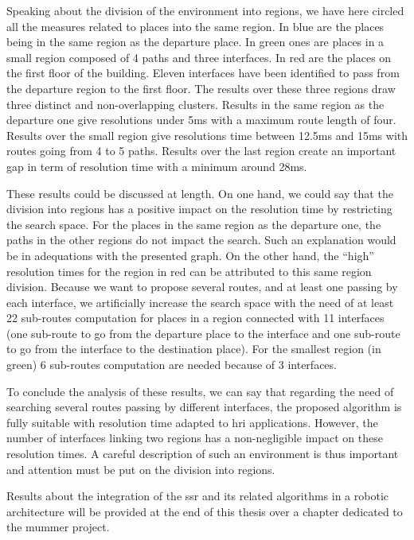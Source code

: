 Speaking about the division of the environment into regions, we have here circled all the measures related to places into the same region. In blue are the places being in the same region as the departure place. In green ones are places in a small region composed of 4 paths and three interfaces. In red are the places on the first floor of the building. Eleven interfaces have been identified to pass from the departure region to the first floor. The results over these three regions draw three distinct and non-overlapping clusters. Results in the same region as the departure one give resolutions under 5ms with a maximum route length of four. Results over the small region give resolutions time between 12.5ms and 15ms with routes going from 4 to 5 paths. Results over the last region create an important gap in term of resolution time with a minimum around 28ms. 

These results could be discussed at length. On one hand, we could say that the division into regions has a positive impact on the resolution time by restricting the search space. For the places in the same region as the departure one, the paths in the other regions do not impact the search. Such an explanation would be in adequations with the presented graph. On the other hand, the ``high'' resolution times for the region in red can be attributed to this same region division. Because we want to propose several routes, and at least one passing by each interface, we artificially increase the search space with the need of at least 22 sub-routes computation for places in a region connected with 11 interfaces (one sub-route to go from the departure place to the interface and one sub-route to go from the interface to the destination place). For the smallest region (in green) 6 sub-routes computation are needed because of 3 interfaces.

To conclude the analysis of these results, we can say that regarding the need of searching several routes passing by different interfaces, the proposed algorithm is fully suitable with resolution time adapted to \acrshort{hri} applications. However, the number of interfaces linking two regions has a non-negligible impact on these resolution times. A careful description of such an environment is thus important and attention must be put on the division into regions.  

Results about the integration of the \acrshort{ssr} and its related algorithms in a robotic architecture will be provided at the end of this thesis over a chapter dedicated to the \acrshort{mummer} project.
